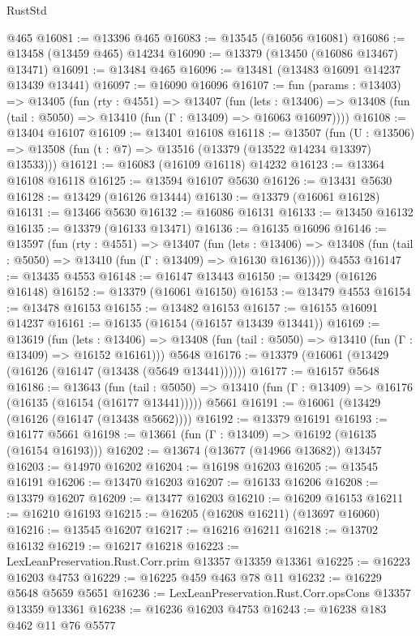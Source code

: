 \begin{lexlean}{RustStd}
\begin{coremodule}
    @465
@16081 := @13396 @465
@16083 := @13545 (@16056 @16081)
@16086 := @13458 (@13459 @465) @14234
@16090 := @13379 (@13450 (@16086 @13467) @13471)
@16091 := @13484 @465
@16096 := @13481 (@13483 @16091 @14237 @13439 @13441)
@16097 := @16090 @16096
@16107 := fun (params : @13403) =>
  @13405
    (fun (rty : @4551) =>
    @13407
      (fun (lets : @13406) =>
      @13408 (fun (tail : @5050) => @13410 (fun (Γ : @13409) => @16063 @16097))))
@16108 := @13404 @16107
@16109 := @13401 @16108
@16118 := @13507
    (fun (U : @13506) => @13508 (fun (t : @7) => @13516 (@13379 (@13522 @14234 @13397) @13533)))
@16121 := @16083 (@16109 @16118) @14232
@16123 := @13364 @16108 @16118
@16125 := @13594 @16107 @5630
@16126 := @13431 @5630
@16128 := @13429 (@16126 @13444)
@16130 := @13379 (@16061 @16128)
@16131 := @13466 @5630
@16132 := @16086 @16131
@16133 := @13450 @16132
@16135 := @13379 (@16133 @13471)
@16136 := @16135 @16096
@16146 := @13597
    (fun (rty : @4551) =>
    @13407
      (fun (lets : @13406) =>
      @13408 (fun (tail : @5050) => @13410 (fun (Γ : @13409) => @16130 @16136))))
    @4553
@16147 := @13435 @4553
@16148 := @16147 @13443
@16150 := @13429 (@16126 @16148)
@16152 := @13379 (@16061 @16150)
@16153 := @13479 @4553
@16154 := @13478 @16153
@16155 := @13482 @16153
@16157 := @16155 @16091 @14237
@16161 := @16135 (@16154 (@16157 @13439 @13441))
@16169 := @13619
    (fun (lets : @13406) =>
    @13408 (fun (tail : @5050) => @13410 (fun (Γ : @13409) => @16152 @16161)))
    @5648
@16176 := @13379 (@16061 (@13429 (@16126 (@16147 (@13438 (@5649 @13441))))))
@16177 := @16157 @5648
@16186 := @13643
    (fun (tail : @5050) => @13410 (fun (Γ : @13409) => @16176 (@16135 (@16154 (@16177 @13441)))))
    @5661
@16191 := @16061 (@13429 (@16126 (@16147 (@13438 @5662))))
@16192 := @13379 @16191
@16193 := @16177 @5661
@16198 := @13661 (fun (Γ : @13409) => @16192 (@16135 (@16154 @16193)))
@16202 := @13674 (@13677 (@14966 @13682)) @13457
@16203 := @14970 @16202
@16204 := @16198 @16203
@16205 := @13545 @16191
@16206 := @13470 @16203
@16207 := @16133 @16206
@16208 := @13379 @16207
@16209 := @13477 @16203
@16210 := @16209 @16153
@16211 := @16210 @16193
@16215 := @16205 (@16208 @16211) (@13697 @16060)
@16216 := @13545 @16207
@16217 := @16216 @16211
@16218 := @13702 @16132
@16219 := @16217 @16218
@16223 := LexLeanPreservation.Rust.Corr.prim @13357 @13359 @13361
@16225 := @16223 @16203 @4753
@16229 := @16225 @459 @463 @78 @11
@16232 := @16229 @5648 @5659 @5651
@16236 := LexLeanPreservation.Rust.Corr.opsCons @13357 @13359 @13361
@16238 := @16236 @16203 @4753
@16243 := @16238 @183 @462 @11 @76 @5577

\end{coremodule}
\end{lexlean}
